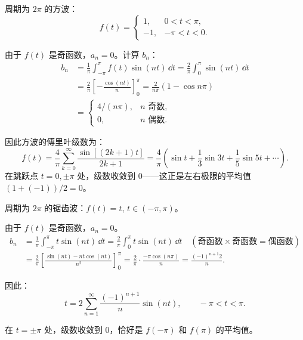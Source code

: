 \begin{example}[方波的傅里叶级数]
周期为 $2\pi$ 的方波：
\begin{equation}
f(t) = \begin{cases}
1, & 0 < t < \pi,\\
-1, & -\pi < t < 0.
\end{cases}
\end{equation}

由于 $f(t)$ 是奇函数，$a_n=0$。计算 $b_n$：
\begin{align*}
b_n &= \frac{1}{\pi}\int_{-\pi}^{\pi} f(t)\sin(nt)\,\dd t
= \frac{2}{\pi}\int_{0}^{\pi} \sin(nt)\,\dd t \\
&= \frac{2}{\pi}\left[-\frac{\cos(nt)}{n}\right]_0^{\pi}
= \frac{2}{n\pi}(1 - \cos n\pi) \\
&= \begin{cases}
4/(n\pi), & n\text{ 奇数},\\
0, & n\text{ 偶数}.
\end{cases}
\end{align*}

因此方波的傅里叶级数为：
\begin{equation}
f(t) = \frac{4}{\pi}\sum_{k=0}^{\infty}\frac{\sin[(2k+1)t]}{2k+1}
= \frac{4}{\pi}\left(\sin t + \frac{1}{3}\sin 3t + \frac{1}{5}\sin 5t + \cdots\right).
\end{equation}
在跳跃点 $t=0,\pm\pi$ 处，级数收敛到 $0$——这正是左右极限的平均值 $(1+(-1))/2=0$。
\end{example}

\begin{example}[锯齿波的傅里叶级数]
周期为 $2\pi$ 的锯齿波：$f(t) = t$, $t\in(-\pi,\pi)$。

由于 $f(t)$ 是奇函数，$a_n=0$。
\begin{align*}
b_n &= \frac{1}{\pi}\int_{-\pi}^{\pi} t\sin(nt)\,\dd t
= \frac{2}{\pi}\int_{0}^{\pi} t\sin(nt)\,\dd t\quad(\text{奇函数}\times\text{奇函数}=\text{偶函数}) \\
&= \frac{2}{\pi}\left[\frac{\sin(nt) - nt\cos(nt)}{n^2}\right]_0^{\pi}
= \frac{2}{\pi}\cdot\frac{-\pi\cos(n\pi)}{n} = \frac{(-1)^{n+1}2}{n}.
\end{align*}

因此：
\begin{equation}
t = 2\sum_{n=1}^{\infty} \frac{(-1)^{n+1}}{n}\sin(nt),\qquad -\pi < t < \pi.
\end{equation}

在 $t=\pm\pi$ 处，级数收敛到 $0$，恰好是 $f(-\pi)$ 和 $f(\pi)$ 的平均值。
\end{example}

